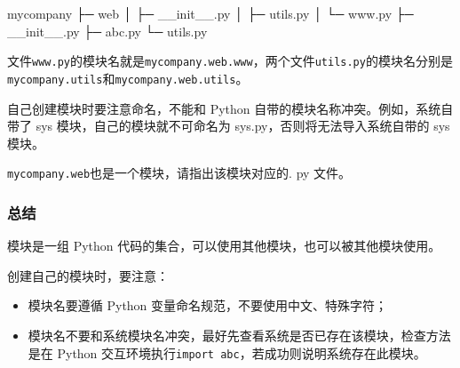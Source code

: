 \begin{pythoncode}
mycompany
 ├─ web
 │  ├─ __init__.py
 │  ├─ utils.py
 │  └─ www.py
 ├─ __init__.py
 ├─ abc.py
 └─ utils.py
\end{pythoncode}

文件\texttt{www.py}的模块名就是\texttt{mycompany.web.www}，两个文件\texttt{utils.py}的模块名分别是\texttt{mycompany.utils}和\texttt{mycompany.web.utils}。

自己创建模块时要注意命名，不能和 Python
自带的模块名称冲突。例如，系统自带了 sys 模块，自己的模块就不可命名为
sys.py，否则将无法导入系统自带的 sys 模块。

\texttt{mycompany.web}也是一个模块，请指出该模块对应的. py 文件。

\hypertarget{ux603bux7ed3}{%
\subsubsection{总结}\label{ux603bux7ed3}}

模块是一组 Python 代码的集合，可以使用其他模块，也可以被其他模块使用。

创建自己的模块时，要注意：

\begin{itemize}
\item
  模块名要遵循 Python 变量命名规范，不要使用中文、特殊字符；
\item
  模块名不要和系统模块名冲突，最好先查看系统是否已存在该模块，检查方法是在
  Python 交互环境执行\texttt{import\ abc}，若成功则说明系统存在此模块。
\end{itemize}

